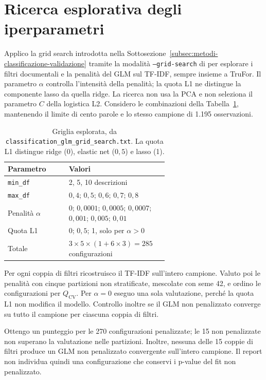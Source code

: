 \section{Ricerca esplorativa degli iperparametri}
\label{sec:associazione-grid-search}

Applico la grid search introdotta nella Sottosezione~\ref{subsec:metodi-classificazione-validazione} tramite la modalità \texttt{--grid-search} di  per esplorare i filtri documentali e la penalità del GLM sul TF-IDF, sempre insieme a TruFor. Il parametro $\alpha$ controlla l'intensità della penalità; la quota L1 ne distingue la componente lasso da quella ridge. La ricerca non usa la PCA e non seleziona il parametro $C$ della logistica L2. Considero le combinazioni della Tabella~\ref{tab:associazione-grid-parametri}, mantenendo il limite di cento parole e lo stesso campione di 1.195 osservazioni.

\begin{table}[htbp]
    \centering\small
    \caption{Griglia esplorata, da \texttt{classification\_glm\_grid\_search.txt}. La quota L1 distingue ridge (0), elastic net ($0{,}5$) e lasso (1).}
    \label{tab:associazione-grid-parametri}
    \begin{tabular}{@{}lp{0.62\linewidth}@{}}
        \toprule
        Parametro & Valori \\
        \midrule
        \texttt{min\_df} & 2, 5, 10 descrizioni \\
        \texttt{max\_df} & $0{,}4$; $0{,}5$; $0{,}6$; $0{,}7$; $0{,}8$ \\
        Penalità $\alpha$ & 0; $0{,}0001$; $0{,}0005$; $0{,}0007$; $0{,}001$; $0{,}005$; $0{,}01$ \\
        Quota L1 & 0; $0{,}5$; 1, solo per $\alpha>0$ \\
        Totale & $3\times5\times(1+6\times3)=285$ configurazioni \\
        \bottomrule
    \end{tabular}
\end{table}

Per ogni coppia di filtri ricostruisco il TF-IDF sull'intero campione. Valuto poi le penalità con cinque partizioni non stratificate, mescolate con seme 42, e ordino le configurazioni per $Q_{\mathrm{CV}}$. Per $\alpha=0$ eseguo una sola valutazione, perché la quota L1 non modifica il modello. Controllo inoltre se il GLM non penalizzato converge su tutto il campione per ciascuna coppia di filtri.

Ottengo un punteggio per le 270 configurazioni penalizzate; le 15 non penalizzate non superano la valutazione nelle partizioni. Inoltre, nessuna delle 15 coppie di filtri produce un GLM non penalizzato convergente sull'intero campione. Il report non individua quindi una configurazione che conservi i p-value del fit non penalizzato.

